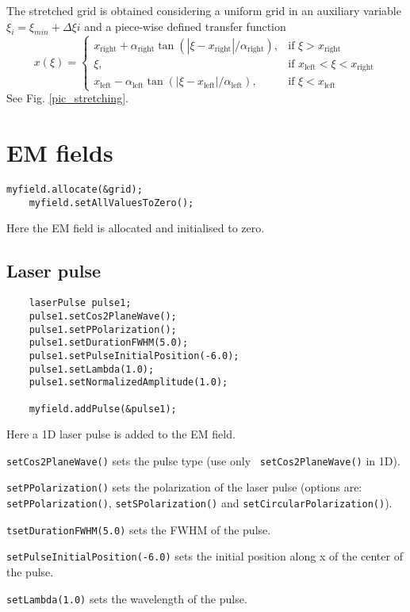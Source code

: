 \documentclass[11pt,a4paper]{report}
\begin{document}
The stretched grid is obtained considering a uniform grid in an 
auxiliary variable $\xi_i=\xi_{min}+\Delta\xi i$ and a piece-wise defined transfer function
$$
x(\xi) =
\begin{cases}
x_{\text{right}}+\alpha_{\text{right}} \tan\left(
\left|\xi-x_{\text{right}}\right|/\alpha_{\text{right}}\right), & \text{if } \xi>x_{\text{right}}\\
\xi, & \text{if }x_{\text{left}}<\xi<x_{\text{right}}\\
x_{\text{left}}-\alpha_{\text{left}} \tan\left(
\left|\xi-x_{\text{left}}\right|/\alpha_{\text{left}}\right), & \text{if } \xi<x_{\text{left}}
\end{cases}
$$
See Fig. \ref{pic_stretching}.


\section{EM fields}
\begin{lstlisting}[backgroundcolor=\color{no_modify}]
	myfield.allocate(&grid);
	myfield.setAllValuesToZero();
\end{lstlisting}
Here the EM field is allocated and initialised to zero.
\subsection{Laser pulse}

\begin{lstlisting}
	laserPulse pulse1;
	pulse1.setCos2PlaneWave();
   	pulse1.setPPolarization();
   	pulse1.setDurationFWHM(5.0);
   	pulse1.setPulseInitialPosition(-6.0);
   	pulse1.setLambda(1.0);
   	pulse1.setNormalizedAmplitude(1.0);

	myfield.addPulse(&pulse1);
\end{lstlisting}
Here a 1D laser pulse is added to the EM field.

\verb+setCos2PlaneWave()+ sets the pulse type (use only \verb+ setCos2PlaneWave()+ in 1D).

\verb+setPPolarization()+ sets the polarization of the laser pulse (options are: \texttt{setPPolarization()}, \texttt{setSPolarization()} and \texttt{setCircularPolarization()}).

\verb+tsetDurationFWHM(5.0)+ sets the FWHM of the pulse.

\verb+setPulseInitialPosition(-6.0)+ sets the initial position along x of the center of the pulse.

\verb+setLambda(1.0)+ sets the wavelength of the pulse.
\end{document}
